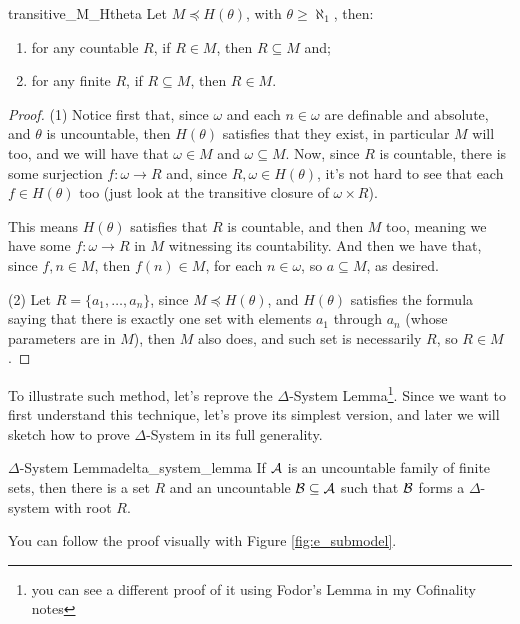 \begin{lemma}{}{transitive_M_Htheta}
    Let $M\preccurlyeq H(\theta)$, with $\theta\geq\aleph_1$, then:
    \begin{enumerate}
        \item for any countable $R$, if $R\in M$, then $R\subseteq M$ and;
        \item for any finite $R$, if $R\subseteq M$, then $R\in M$.
    \end{enumerate}
\end{lemma}

\begin{proof}
    (1) Notice first that, since $\omega$ and each $n\in\omega$ are definable and absolute, and $\theta$ is uncountable, then $H(\theta)$ satisfies that they exist, in particular $M$ will too, and we will have that $\omega\in M$ and $\omega\subseteq M$. Now, since $R$ is countable, there is some surjection $f:\omega\to R$ and, since $R,\omega\in H(\theta)$, it's not hard to see that each $f\in H(\theta)$ too (just look at the transitive closure of $\omega\times R$).

    This means $H(\theta)$ satisfies that $R$ is countable, and then $M$ too, meaning we have some $f:\omega\to R$ in $M$ witnessing its countability. And then we have that, since $f,n\in M$, then $f(n)\in M$, for each $n\in\omega$, so $a\subseteq M$, as desired.

    (2) Let $R=\{a_1,\dots,a_n\}$, since $M\preceq H(\theta)$, and $H(\theta)$ satisfies the formula saying that there is exactly one set with elements $a_1$ through $a_n$ (whose parameters are in $M$), then $M$ also does, and such set is necessarily $R$, so $R\in M$.
\end{proof}

To illustrate such method, let's reprove the $\Delta$-System Lemma\footnote{you can see a different proof of it using Fodor's Lemma in my Cofinality notes}. Since we want to first understand this technique, let's prove its simplest version, and later we will sketch how to prove $\Delta$-System in its full generality.

\begin{theorem}{$\Delta$-System Lemma}{delta_system_lemma}
    If $\mathcal{A}$ is an uncountable family of finite sets, then there is a set $R$ and an uncountable $\mathcal{B}\subseteq\mathcal{A}$ such that $\mathcal{B}$ forms a $\Delta$-system with root $R$.
\end{theorem}

You can follow the proof visually with Figure \ref{fig:e_submodel}.

